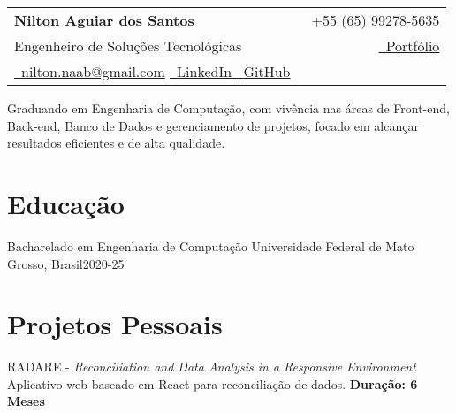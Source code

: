 

\newcommand{\name}{Nilton Aguiar dos Santos} %
\newcommand{\course}{Engenharia de Computação} %
\newcommand{\phone}{+55 (65) 99278-5635} %
\newcommand{\emaila}{nilton.naab@gmail.com} %
\newcommand{\github}{https://github.com/notNilton} %
\newcommand{\linkedin}{https://www.linkedin.com/in/notnilton/} %
\newcommand{\portifolio}{https://github.com/notNilton} %




{
\begin{tabularx}{\linewidth}{L r}                                                               \\
    \textbf{\Large \name} & {\raisebox{0.0\height}{\footnotesize \faPhone}\ \phone}
    \\
    {Engenheiro de Soluções Tecnológicas}
                          &
    \href{\portifolio}{\raisebox{0.0\height}{\footnotesize \faGlobe}\ {Portfólio}}
    \\
    \href{mailto:\emaila} {\raisebox{0.0\height}{\footnotesize \faEnvelope}\ {\emaila}}
    \href{\linkedin}{\raisebox{0.0\height}{\footnotesize \faLinkedin}\ {LinkedIn} }
    \href{\github}{\raisebox{0.0\height}{\footnotesize \faGithub}\ {GitHub} }
\end{tabularx}
}
\vspace{1mm}

Graduando em Engenharia de Computação, com vivência nas áreas de Front-end,
Back-end, Banco de Dados e gerenciamento de projetos, focado em alcançar
resultados eficientes e de alta qualidade.

\section{\textbf{Educação}}
\resumeSubHeadingListStart
\resumeSubheading
{Bacharelado em Engenharia de Computação}{}
{Universidade Federal de Mato Grosso, Brasil}{2020-25}
\resumeSubHeadingListEnd
\vspace{-5.5mm}

\section{\textbf{Projetos Pessoais}}
\resumeSubHeadingListStart
\resumeProject
{ RADARE - \textit{Reconciliation and Data Analysis in a Responsive Environment}}
{Aplicativo web baseado em React para reconciliação de dados.}
{\textbf{Duração: 6 Meses}}


